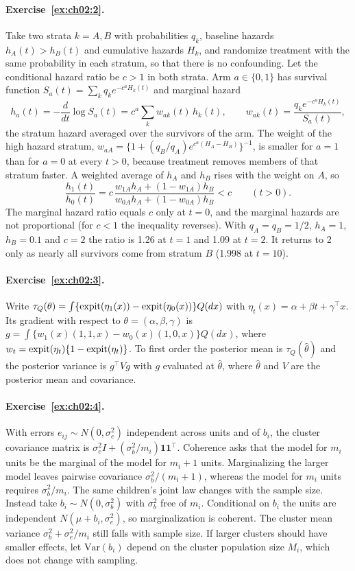 \paragraph{Exercise~\ref{ex:ch02:2}.} Take two strata $k = A, B$ with probabilities $q_k$, baseline hazards $h_A(t) > h_B(t)$ and cumulative hazards $H_k$, and randomize treatment with the same probability in each stratum, so that there is no confounding. Let the conditional hazard ratio be $c > 1$ in both strata. Arm $a \in \{0, 1\}$ has survival function $S_a(t) = \sum_k q_k e^{-c^a H_k(t)}$ and marginal hazard
\[
h_a(t) = -\frac{d}{dt}\log S_a(t) = c^a \sum_k w_{ak}(t)\,h_k(t), \qquad w_{ak}(t) = \frac{q_k e^{-c^a H_k(t)}}{S_a(t)},
\]
the stratum hazard averaged over the survivors of the arm. The weight of the high hazard stratum, $w_{aA} = \{1 + (q_B/q_A)e^{c^a(H_A - H_B)}\}^{-1}$, is smaller for $a = 1$ than for $a = 0$ at every $t > 0$, because treatment removes members of that stratum faster. A weighted average of $h_A$ and $h_B$ rises with the weight on $A$, so
\[
\frac{h_1(t)}{h_0(t)} = c\,\frac{w_{1A}h_A + (1 - w_{1A})h_B}{w_{0A}h_A + (1 - w_{0A})h_B} < c \qquad (t > 0).
\]
The marginal hazard ratio equals $c$ only at $t = 0$, and the marginal hazards are not proportional (for $c < 1$ the inequality reverses). With $q_A = q_B = 1/2$, $h_A = 1$, $h_B = 0.1$ and $c = 2$ the ratio is 1.26 at $t = 1$ and 1.09 at $t = 2$. It returns to 2 only as nearly all survivors come from stratum $B$ (1.998 at $t = 10$).

\paragraph{Exercise~\ref{ex:ch02:3}.} Write $\tau_Q(\theta) = \int \{\operatorname{expit}(\eta_1(x)) - \operatorname{expit}(\eta_0(x))\}Q(dx)$ with $\eta_t(x) = \alpha + \beta t + \gamma^\top x$. Its gradient with respect to $\theta = (\alpha, \beta, \gamma)$ is $g = \int \{w_1(x)(1, 1, x) - w_0(x)(1, 0, x)\}Q(dx)$, where $w_t = \operatorname{expit}(\eta_t)\{1 - \operatorname{expit}(\eta_t)\}$. To first order the posterior mean is $\tau_Q(\hat\theta)$ and the posterior variance is $g^\top V g$ with $g$ evaluated at $\hat\theta$, where $\hat\theta$ and $V$ are the posterior mean and covariance.

\paragraph{Exercise~\ref{ex:ch02:4}.} With errors $e_{ij}\sim N(0,\sigma_e^2)$ independent across units and of $b_i$, the cluster covariance matrix is $\sigma_e^2I+(\sigma_b^2/m_i)\mathbf1\mathbf1^\top$. Coherence asks that the model for $m_i$ units be the marginal of the model for $m_i+1$ units. Marginalizing the larger model leaves pairwise covariance $\sigma_b^2/(m_i+1)$, whereas the model for $m_i$ units requires $\sigma_b^2/m_i$. The same children's joint law changes with the sample size. Instead take $b_i\sim N(0,\sigma_b^2)$ with $\sigma_b^2$ free of $m_i$. Conditional on $b_i$ the units are independent $N(\mu+b_i,\sigma_e^2)$, so marginalization is coherent. The cluster mean variance $\sigma_b^2+\sigma_e^2/m_i$ still falls with sample size. If larger clusters should have smaller effects, let $\mathrm{Var}(b_i)$ depend on the cluster population size $M_i$, which does not change with sampling.

